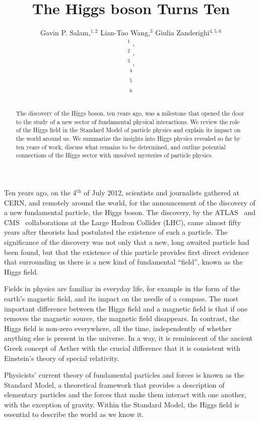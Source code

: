 \documentclass{article}
\title{The Higgs boson Turns Ten}
\author{Gavin P. Salam,$^{1,2}$ Lian-Tao Wang,$^{3}$ Giulia Zanderighi$^{4,5,6}$\\
    \normalsize $^1$ \OXaff,\\
    \normalsize $^2$ \ASCaff,\\
    \normalsize $^3$ \Chiaff,\\
    \normalsize $^4$ \MPIaff\\
    \normalsize $^5$ \TUMaff\\
    \normalsize $^6$ \GZemail\\    
}
\date{}
\begin{document}
\maketitle

\begin{abstract}
  The discovery of the Higgs boson, ten years ago, was a milestone
  that opened the door to the study of a new sector of fundamental
  physical interactions.
  We review the role of the Higgs field in the Standard Model of
  particle physics and explain its impact on the world around us.
  We summarize the insights into Higgs physics revealed so far by ten years of work, discuss what remains
  to be determined, and
  outline potential connections of the Higgs sector with unsolved
  mysteries of particle physics.
\end{abstract}
\bigskip

Ten years ago, on the 4$^\text{th}$ of July 2012, scientists and journalists
gathered at CERN, and remotely around the world, for the announcement
of the discovery of a new fundamental particle, the Higgs boson.
%
The discovery, by the ATLAS~\cite{ATLAS:2012yve} and
CMS~\cite{CMS:2012qbp} collaborations at the Large Hadron Collider
(LHC), came almost fifty years after theorists had postulated the existence
of such a particle.
%
The significance of the discovery was not only that a new, long
awaited particle had been found, but that the existence of this
particle provides first direct evidence that surrounding us there is a
new kind of fundamental ``field'', known as the Higgs field.

Fields in physics are familiar in everyday life, for example 
in the form of the earth's magnetic field, and its
impact on the needle of a compass.
% 
The most important difference between the Higgs field and a magnetic field is that  if one removes the magnetic source,
the magnetic field disappears.
%
In contrast, the Higgs field is non-zero everywhere, all the time, independently of whether
anything else is present in the universe.
%
In a way, it is reminiscent of the ancient Greek concept of Aether
with the crucial difference that it is consistent with
Einstein's theory of special relativity.

Physicists' current theory of fundamental particles and forces is
known as the Standard Model, a theoretical framework that provides a
description of elementary particles and the forces that make them
interact with one another, with the exception of gravity. Within the
Standard Model, the Higgs field is essential to describe the world as
we know it.
%
\end{document}
